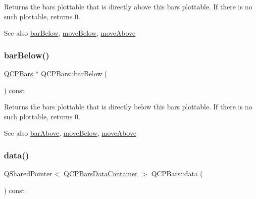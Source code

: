 Returns the bars plottable that is directly above this bars plottable. If there is no such plottable, returns 0.

\begin{DoxySeeAlso}{See also}
\hyperlink{classQCPBars_a1b58664864b141f45e02044a855b3213}{bar\+Below}, \hyperlink{classQCPBars_a69fc371346980f19177c3d1ecdad78ee}{move\+Below}, \hyperlink{classQCPBars_ac22e00a6a41509538c21b04f0a57318c}{move\+Above} 
\end{DoxySeeAlso}
\mbox{\label{classQCPBars_a1b58664864b141f45e02044a855b3213}} 
\subsubsection{\texorpdfstring{bar\+Below()}{barBelow()}}
{\footnotesize\ttfamily \hyperlink{classQCPBars}{Q\+C\+P\+Bars} $\ast$ Q\+C\+P\+Bars\+::bar\+Below (\begin{DoxyParamCaption}{ }\end{DoxyParamCaption}) const\hspace{0.3cm}{\ttfamily [inline]}}

Returns the bars plottable that is directly below this bars plottable. If there is no such plottable, returns 0.

\begin{DoxySeeAlso}{See also}
\hyperlink{classQCPBars_ab97f2acd9f6cb40d2cc3c33d278f0e78}{bar\+Above}, \hyperlink{classQCPBars_a69fc371346980f19177c3d1ecdad78ee}{move\+Below}, \hyperlink{classQCPBars_ac22e00a6a41509538c21b04f0a57318c}{move\+Above} 
\end{DoxySeeAlso}
\mbox{\label{classQCPBars_a7e373a534d82e18ed27b3fafd1f08fae}} 
\subsubsection{\texorpdfstring{data()}{data()}}
{\footnotesize\ttfamily Q\+Shared\+Pointer$<$ \hyperlink{classQCPDataContainer}{Q\+C\+P\+Bars\+Data\+Container} $>$ Q\+C\+P\+Bars\+::data (\begin{DoxyParamCaption}{ }\end{DoxyParamCaption}) const\hspace{0.3cm}{\ttfamily [inline]}}


